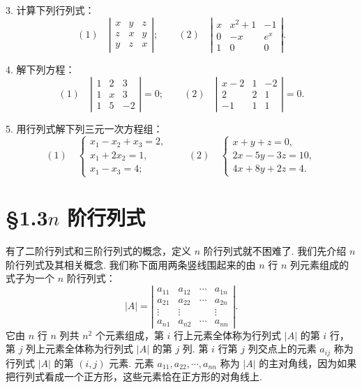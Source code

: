\documentclass[UTF8,12pt,a4paper,fontset=fandol]{ctexart}
\begin{document}
3. 计算下列行列式：
\[
(1)\quad
\left|\begin{array}{ccc}
x & y & z\\
z & x & y\\
y & z & x
\end{array}\right|;\qquad
(2)\quad
\left|\begin{array}{ccc}
x & x^2+1 & -1\\
0 & -x & e^x\\
1 & 0 & 0
\end{array}\right|.
\]

4. 解下列方程：
\[
(1)\quad
\left|\begin{array}{ccc}
1 & 2 & 3\\
1 & x & 3\\
1 & 5 & -2
\end{array}\right|=0;\qquad
(2)\quad
\left|\begin{array}{ccc}
x-2 & 1 & -2\\
2 & 2 & 1\\
-1 & 1 & 1
\end{array}\right|=0.
\]

5. 用行列式解下列三元一次方程组：
\[
(1)\quad
\left\{
\begin{array}{l}
x_1-x_2+x_3=2,\\
x_1+2x_2=1,\\
x_1-x_3=4;
\end{array}
\right.
\qquad
(2)\quad
\left\{
\begin{array}{l}
x+y+z=0,\\
2x-5y-3z=10,\\
4x+8y+2z=4.
\end{array}
\right.
\]

\section*{§1.3\quad $n$ 阶行列式}

有了二阶行列式和三阶行列式的概念，定义 $n$ 阶行列式就不困难了. 我们先介绍 $n$ 阶行列式及其相关概念. 我们称下面用两条竖线围起来的由 $n$ 行 $n$ 列元素组成的式子为一个 $n$ 阶行列式：
\begin{equation}
|A|=
\left|\begin{array}{cccc}
a_{11} & a_{12} & \cdots & a_{1n}\\
a_{21} & a_{22} & \cdots & a_{2n}\\
\vdots & \vdots & & \vdots\\
a_{n1} & a_{n2} & \cdots & a_{nn}
\end{array}\right|.
\tag{1.3.1}
\end{equation}
它由 $n$ 行 $n$ 列共 $n^2$ 个元素组成，第 $i$ 行上元素全体称为行列式 $|A|$ 的第 $i$ 行，第 $j$ 列上元素全体称为行列式 $|A|$ 的第 $j$ 列. 第 $i$ 行第 $j$ 列交点上的元素 $a_{ij}$ 称为行列式 $|A|$ 的第 $(i,j)$ 元素. 元素 $a_{11},a_{22},\cdots,a_{nn}$ 称为 $|A|$ 的主对角线，因为如果把行列式看成一个正方形，这些元素恰在正方形的对角线上.
\end{document}
